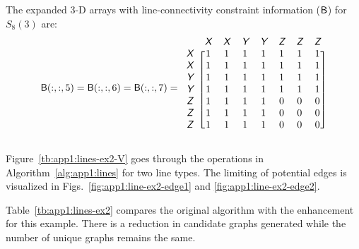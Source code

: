 \noindent The expanded 3-D arrays with line-connectivity constraint information ($\textup{\textsf{B}}$) for $S_8(3)$ are:
\begin{align}
\begin{aligned}
\xvar{B}(:,:,5) = \xvar{B}(:,:,6) = \xvar{B}(:,:,7) =
\begin{blockarray}{cccccccc}
& \xcolor{X} & \xcolor{X} & \xcolor{Y} & \xcolor{Y} & \xcolor{Z} & \xcolor{Z} & \xcolor{Z} \\
\begin{block}{c[ccccccc]}
\xcolor{X} & 1 & 1 & 1 & 1 & 1 & 1 & 1 \\
\xcolor{X} & 1 & 1 & 1 & 1 & 1 & 1 & 1 \\
\xcolor{Y} & 1 & 1 & 1 & 1 & 1 & 1 & 1 \\
\xcolor{Y} & 1 & 1 & 1 & 1 & 1 & 1 & 1 \\
\xcolor{Z} & 1 & 1 & 1 & 1 & 0 & 0 & 0 \\
\xcolor{Z} & 1 & 1 & 1 & 1 & 0 & 0 & 0 \\
\xcolor{Z} & 1 & 1 & 1 & 1 & 0 & 0 & 0 \\
\end{block}
\end{blockarray}
\end{aligned}
\end{align}
\vspace{-2em}

\noindent Figure~\ref{tb:app1:lines-ex2-V} goes through the operations in Algorithm~\ref{alg:app1:lines} for two line types.
The limiting of potential edges is visualized in Figs.~\ref{fig:app1:line-ex2-edge1} and \ref{fig:app1:line-ex2-edge2}.

Table~\ref{tb:app1:lines-ex2} compares the original algorithm with the enhancement for this example. There is a reduction in candidate graphs generated while the number of unique graphs remains the same.

